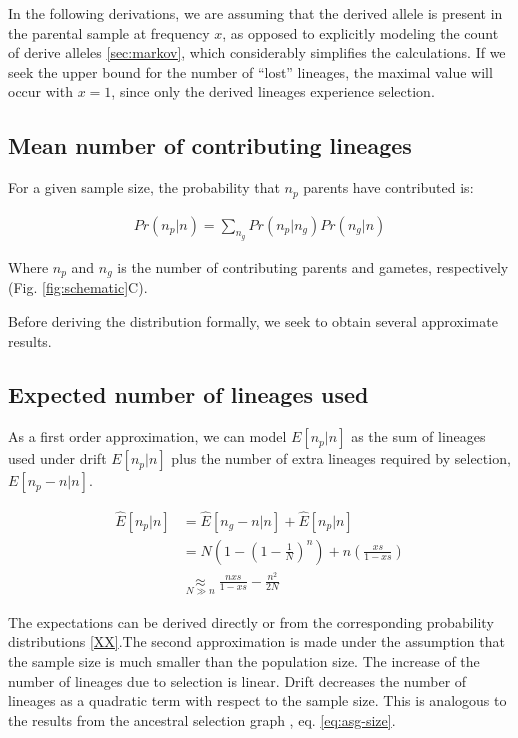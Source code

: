 \documentclass[review]{elsarticle}
\begin{document}
In the following derivations, we are assuming that the derived allele is present in the parental
sample at frequency $x$, as opposed to explicitly modeling the count of derive alleles
\ref{sec:markov}, which considerably simplifies the calculations. If we seek the upper bound for the
number of ``lost'' lineages, the maximal value will occur with $x=1$, since only the derived
lineages experience selection.

\subsection{Mean number of contributing lineages}
\label{sec:mean-contr}

For a given sample size, the probability that $n_p$ parents have contributed is:

\begin{align}
  \label{eq:conditional}
  Pr(n_p | n) = \sum_{n_g} Pr(n_p | n_g)Pr(n_g | n)
\end{align}

Where $n_p$ and $n_g$ is the number of contributing parents and gametes, respectively (Fig.
\ref{fig:schematic}C).

Before deriving the distribution formally, we seek to obtain several approximate results.

\subsection{Expected number of lineages used}
\label{subsec:exp-number}

As a first order approximation, we can model $E[n_p | n]$ as the sum of lineages used under drift
$E[n_p | n]$ plus the number of extra lineages required by selection, $E[n_p - n | n]$.

\begin{equation*}
  \begin{aligned}
    \hat{E}[n_p  | n] &= \hat{E}[n_g-n | n] + \hat{E}[n_p | n] \\
    &= N(1-\left( 1 - \frac{1}{N} \right)^n) + n\left( \frac{xs}{1-xs}\right) \\
    &\underset{N\gg n}{\approx} \frac{nxs}{1-xs} - \frac{n^2}{2N}
  \end{aligned}
\end{equation*}

The expectations can be derived directly or from the corresponding probability distributions
\eqref{XX}.The second approximation is made under the assumption that the sample size is much
smaller than the population size. The increase of the number of lineages due to selection is linear.
Drift decreases the number of lineages as a quadratic term with respect to the sample size. This is
analogous to the results from the ancestral selection graph \citep{KroneNeuhauser1997}, eq.
\eqref{eq:asg-size}.
\end{document}
